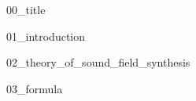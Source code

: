 \documentclass[a4paper, oneside, nobib, notoc, justified, nofonts]{tufte-book}
\def \PATH {.}                                                    %
\begin{document}
\let\cleardoublepage\clearpage

{00_title}

\tableofcontents

{01_introduction}

{02_theory_of_sound_field_synthesis}

{03_formula}

\printbibliography
\end{document}
